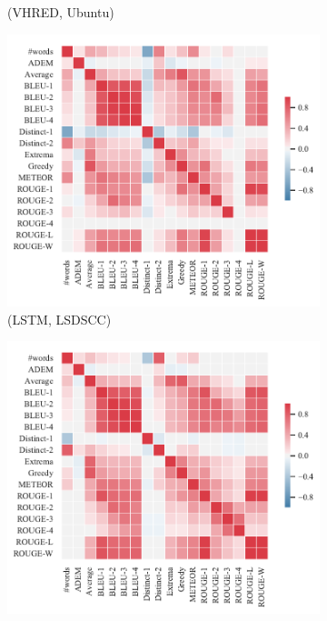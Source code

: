 \begin{figure}[htbp]
\begin{subfigure}{0.35\linewidth}
        \caption{(VHRED, Ubuntu)}
    \end{subfigure}
    \begin{subfigure}{0.35\linewidth}
        \centering
        \includegraphics[width=\linewidth]{figure/plot/heatmap/v4/pearson/lstm/lsdscc/plot.pdf}
        \caption{(LSTM, LSDSCC)}
    \end{subfigure}%
    \begin{subfigure}{0.35\linewidth}
        \centering
        \includegraphics[width=\linewidth]{figure/plot/heatmap/v4/pearson/lstm/opensub/plot.pdf}

\end{subfigure}
\end{figure}
